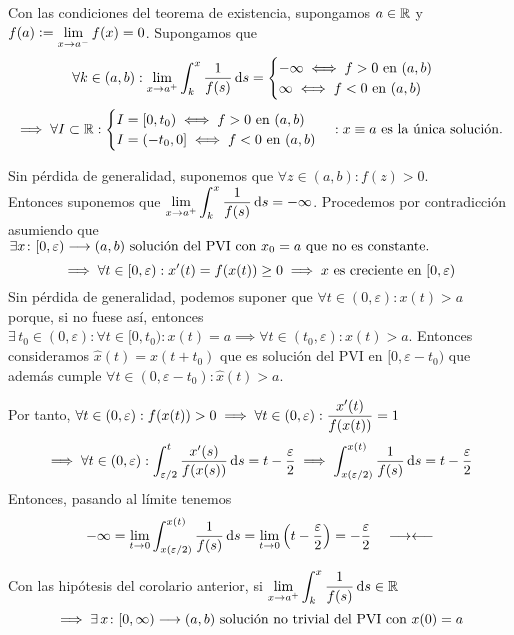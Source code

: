 \begin{cor}
	Con las condiciones del teorema de existencia, supongamos $\displaystyle a\in \mathbb{R}$ y\\
	$\displaystyle f(a)\vcentcolon= \lim_{x\to a^-} f(x)=0$. Supongamos que
	\[\forall k \in (a,b) : \lim_{x\to a^+}\int_{k}^{x} \frac{1}{f(s)} \odif{s} = \begin{cases}
			-\infty \iff f>0 \tex{ en } (a,b) \\
			\infty \iff f<0 \tex{ en } (a,b)
		\end{cases}\]
	\[\implies \forall I \subset \mathbb{R} : \begin{cases}
			I=[0, t_0) \iff f>0 \text{ en } (a,b) \\
			I=(-t_0, 0] \iff f<0 \text{ en } (a,b)
		\end{cases} : x\equiv a\text{ es la única solución.}\]
	\begin{dem}
		Sin pérdida de generalidad, suponemos que $\forall z \in (a,b) : f(z) > 0$. \\
		Entonces suponemos que $\ds \lim_{x\to a^+}\int_{k}^{x} \frac{1}{f(s)} \odif{s} = -\infty$. Procedemos por contradicción asumiendo que $\exists x \colon [0, \varepsilon) \longrightarrow (a,b) \text{ solución del PVI con } x_0 = a \text{ que no es constante.}$
		\[\implies \forall t \in [0, \varepsilon) : x'(t)=f(x(t)) \geq 0 \implies x \text{ es creciente en } [0, \varepsilon)\]
		Sin pérdida de generalidad, podemos suponer que $\forall t \in (0, \varepsilon) : x(t) > a$ porque, si no fuese así, entonces $\exists \, t_0 \in (0, \varepsilon) : \forall t \in [0, t_0) : x(t)=a \implies \forall t \in (t_0, \varepsilon) : x(t) > a$. Entonces consideramos $\hat{x}(t) = x(t + t_0)$ que es solución del PVI en $[0, \varepsilon - t_0)$ que además cumple $\forall t \in (0, \varepsilon - t_0) : \hat{x}(t) > a$.

		Por tanto, $\displaystyle \forall t \in (0, \varepsilon) : f(x(t)) > 0 \implies \forall t \in (0, \varepsilon) : \frac{x'(t)}{f(x(t))} = 1$
		\[\implies \forall t \in (0, \varepsilon) : \int_{\varepsilon/2}^{t} \frac{x'(s)}{f(x(s))} \odif{s} = t -\frac{\varepsilon}{2} \implies \int_{x(\varepsilon/2)}^{x(t)} \frac{1}{f(s)} \odif{s} = t -\frac{\varepsilon}{2}\]
		Entonces, pasando al límite tenemos
		\[-\infty = \lim_{t\to 0} \int_{x(\varepsilon/2)}^{x(t)} \frac{1}{f(s)} \odif{s} = \lim_{t\to 0} \left(t - \frac{\varepsilon}{2}\right) = - \frac{\varepsilon}{2} \quad \contr\]
	\end{dem}
\end{cor}

\begin{cor}
	Con las hipótesis del corolario anterior, si $\ds \lim_{x\to a^+} \int_{k}^{x} \frac{1}{f(s)} \odif{s} \in \R$ \[\implies \exists \, x \colon [0, \infty) \longrightarrow (a,b) \text{ solución no trivial del PVI con } x(0) = a\]
	\begin{dem}
	\end{dem}
\end{cor}

